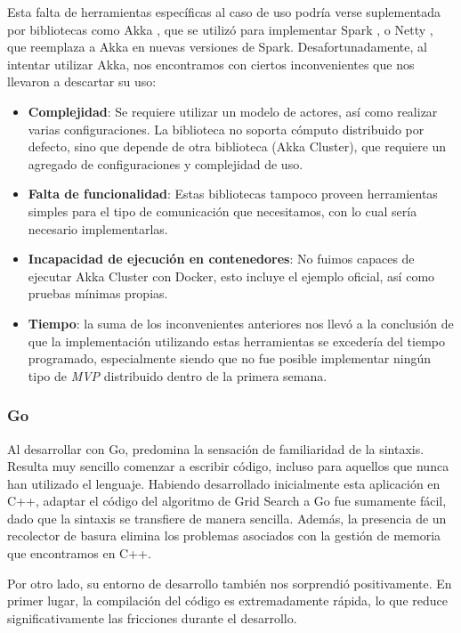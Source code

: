 \documentclass[11pt]{article}
\let\Oldsubsubsection\subsubsection
\renewcommand{\subsubsection}{\FloatBarrier\Oldsubsubsection}
\newcommand{\english}[1]{\textit{#1}}
\begin{document}
Esta falta de herramientas específicas al caso de uso podría verse suplementada por bibliotecas como Akka \cite{scala:lib:akka}, que se utilizó para implementar Spark \cite{scala:ex:spark}, o Netty \cite{scala:lib:netty}, que reemplaza a Akka en nuevas versiones de Spark. Desafortunadamente, al intentar utilizar Akka, nos encontramos con ciertos inconvenientes que nos llevaron a descartar su uso:
\begin{itemize}
    \item \textbf{Complejidad}: Se requiere utilizar un modelo de actores, así como realizar varias configuraciones. La biblioteca no soporta cómputo distribuido por defecto, sino que depende de otra biblioteca (Akka Cluster), que requiere un agregado de configuraciones y complejidad de uso.
    \item \textbf{Falta de funcionalidad}: Estas bibliotecas tampoco proveen herramientas simples para el tipo de comunicación que necesitamos, con lo cual sería necesario implementarlas.
    \item \textbf{Incapacidad de ejecución en contenedores}: No fuimos capaces de ejecutar Akka Cluster con Docker, esto incluye el ejemplo oficial, así como pruebas mínimas propias.
    \item \textbf{Tiempo}: la suma de los inconvenientes anteriores nos llevó a la conclusión de que la implementación utilizando estas herramientas se excedería del tiempo programado, especialmente siendo que no fue posible implementar ningún tipo de \english{MVP} distribuido dentro de la primera semana.
\end{itemize}

\subsubsection{Go}

Al desarrollar con Go, predomina la sensación de familiaridad de la sintaxis. Resulta muy sencillo comenzar a escribir código, incluso para aquellos que nunca han utilizado el lenguaje. Habiendo desarrollado inicialmente esta aplicación en C++, adaptar el código del algoritmo de Grid Search a Go fue sumamente fácil, dado que la sintaxis se transfiere de manera sencilla. Además, la presencia de un recolector de basura elimina los problemas asociados con la gestión de memoria que encontramos en C++.

Por otro lado, su entorno de desarrollo también nos sorprendió positivamente. En primer lugar, la compilación del código es extremadamente rápida, lo que reduce significativamente las fricciones durante el desarrollo.
\end{document}
